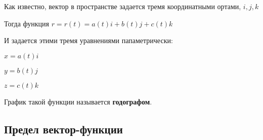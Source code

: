 Как известно, вектор в пространстве задается тремя координатными ортами, $ i,j,k $

Тогда функция $ r = r(t) = a(t)i + b(t)j + c(t)k $

И задается этими тремя уравнениями папаметрически:

$ x = a(t)i $

$ y = b(t)j $

$ z = c(t)k $

График такой функции называется \textbf{годографом}.


\subsection{Предел вектор-функции}

